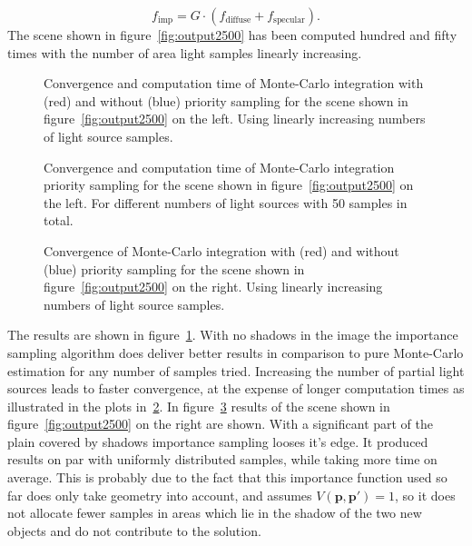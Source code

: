 \begin{equation}
f_{\text{imp}} = G \cdot ( f_{\text{diffuse}} + f_{\text{specular}} ).
\label{eq:impfun1}
\end{equation}
The scene shown in figure~\ref{fig:output2500} has been computed hundred and fifty times with the number of area light samples linearly increasing.
\begin{figure}
\centering


\caption{Convergence and computation time of Monte-Carlo integration with (red) and without (blue) priority sampling for the scene shown in figure~\ref{fig:output2500} on the left. Using linearly increasing numbers of light source samples. }
\label{fig:impSampExp1}
\end{figure}
\begin{figure}
\centering


\caption{Convergence and computation time of Monte-Carlo integration priority sampling for the scene shown in figure~\ref{fig:output2500} on the left. For different numbers of light sources with 50 samples in total. }
\label{fig:impSampExp3}
\end{figure}
\begin{figure}
\centering


\caption{Convergence of Monte-Carlo integration with (red) and without (blue) priority sampling for the scene shown in figure~\ref{fig:output2500} on the right. Using linearly increasing numbers of light source samples. }
\label{fig:impSampExp2}
\end{figure}
The results are shown in figure~\ref{fig:impSampExp1}. With no shadows in the image the importance sampling algorithm does deliver better results in comparison to pure Monte-Carlo estimation for any number of samples tried.
Increasing the number of partial light sources leads to faster convergence, at the expense of longer computation times as illustrated in the plots in~\ref{fig:impSampExp3}. 
In figure~\ref{fig:impSampExp2} results of the scene shown in figure~\ref{fig:output2500} on the right are shown. With a significant part of the plain covered by shadows importance sampling looses it's edge. It produced results on par with uniformly distributed samples, while taking more time on average. This is probably due to the fact that this importance function used so far does only take geometry into account, and assumes $V(\mathbf{p},\mathbf{p}') = 1$, so it does not allocate fewer samples in areas which lie in the shadow of the two new objects and do not contribute to the solution. 
